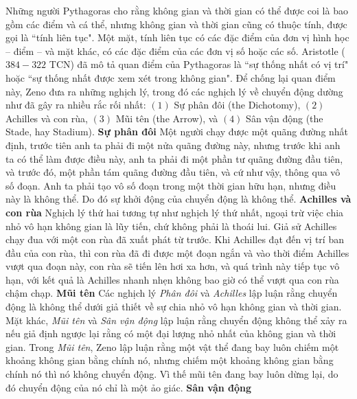 \begin{multicols}{2}
	\vskip 0.1cm
	Những người Pythagoras cho rằng không gian và thời gian có thể được coi là bao gồm các điểm và cá thể, nhưng không gian và thời gian cũng có thuộc tính, được gọi là ``tính liên tục". 
	Một mặt, tính liên tục có các đặc điểm của đơn vị hình học -- điểm -- và mặt khác, có các đặc điểm của các đơn vị số hoặc các số.
	Aristotle ($384-322$ TCN) đã mô tả quan điểm của Pythagoras là ``sự thống nhất có vị trí" hoặc ``sự thống nhất được xem xét trong không gian". 
	Để chống lại quan điểm này, Zeno đưa ra những nghịch lý, trong đó các nghịch lý về chuyển động dường như đã gây ra nhiều rắc rối nhất:
	\vskip 0.1cm
	$(1)$ Sự phân đôi (the Dichotomy), 
	\vskip 0.1cm
	$(2)$ Achilles và con rùa, 
	\vskip 0.1cm
	$(3)$ Mũi tên (the Arrow), và 
	\vskip 0.1cm
	$(4)$ Sân vận động (the Stade, hay Stadium).
	\vskip 0.1cm
	\textbf{\color{lichsutoanhoc}Sự phân đôi}
	\vskip 0.1cm
	Một người chạy được một quãng đường nhất định, trước tiên anh ta phải đi một nửa quãng đường này, nhưng trước khi anh ta có thể làm được điều này, anh ta phải đi một phần tư quãng đường đầu tiên, và trước đó, một phần tám quãng đường đầu tiên, và cứ như vậy, thông qua vô số đoạn.  Anh ta phải tạo vô số đoạn trong một thời gian hữu hạn, nhưng điều này là không thể. Do đó sự khởi động của chuyển động là không thể.
	\vskip 0.1cm
	\textbf{\color{lichsutoanhoc}Achilles và con rùa}
	\vskip 0.1cm
	Nghịch lý thứ hai tương tự như nghịch lý thứ nhất, ngoại trừ việc chia nhỏ vô hạn không gian là lũy tiến, chứ không phải là thoái lui. Giả sử Achilles chạy đua với một con rùa đã xuất phát từ trước. Khi Achilles đạt đến vị trí ban đầu của con rùa, thì con rùa đã đi được một đoạn ngắn và vào thời điểm Achilles vượt qua đoạn này, con rùa sẽ tiến lên hơi xa hơn, và quá trình này tiếp tục vô hạn, với kết quả là Achilles nhanh nhẹn không bao giờ có thể vượt qua con rùa chậm chạp.
	\vskip 0.1cm
	\textbf{\color{lichsutoanhoc}Mũi tên}
	\vskip 0.05cm
	Các nghịch lý \textit{Phân đôi} và \textit{Achilles} lập luận rằng chuyển động là không thể dưới giả thiết về sự chia nhỏ vô hạn không gian và thời gian. Mặt khác, \textit{Mũi tên} và \textit{Sân vận động} lập luận rằng chuyển động không thể xảy ra nếu giả định ngược lại rằng có một đại lượng nhỏ nhất của không gian và thời gian. Trong \textit{Mũi tên}, Zeno lập luận rằng một vật thể đang bay luôn chiếm một khoảng không gian bằng chính nó, nhưng chiếm một khoảng không gian bằng chính nó thì nó không chuyển động. Vì thế mũi tên đang bay luôn dừng lại, do đó chuyển động của nó chỉ là một ảo giác.
	\vskip 0.05cm
	\textbf{\color{lichsutoanhoc}Sân vận động}
	\vskip 0.05cm

\end{multicols}
